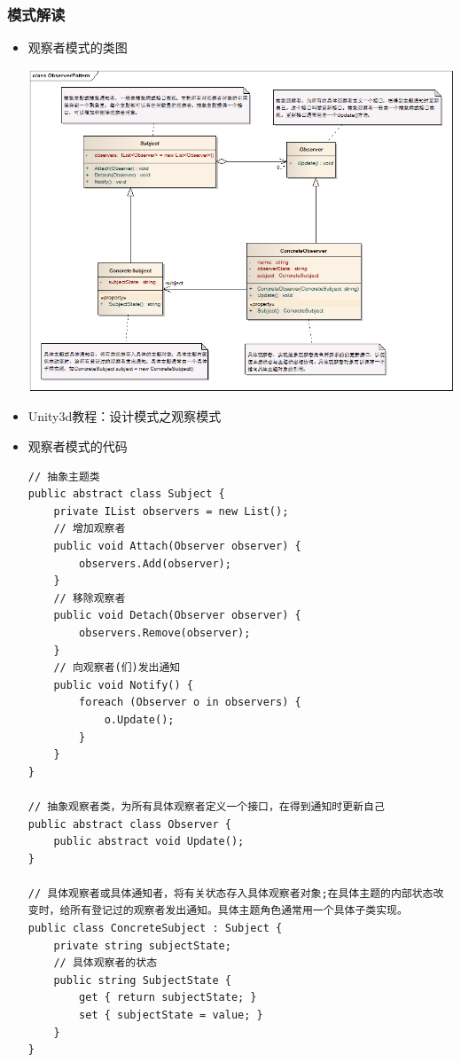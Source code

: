 \documentclass[9pt, b5paper]{article}
\begin{document}
\subsubsection{模式解读}
\label{sec:org22fe456}
\begin{itemize}
\item 观察者模式的类图

\begin{center}
\includegraphics[width=.9\linewidth]{./pic/observer.png}
\end{center}
\item Unity3d教程：设计模式之观察模式
\item 观察者模式的代码
\begin{verbatim}
// 抽象主题类
public abstract class Subject {
    private IList observers = new List();
	// 增加观察者
    public void Attach(Observer observer) {
        observers.Add(observer);
    }
	// 移除观察者
    public void Detach(Observer observer) {
        observers.Remove(observer);
    }
	// 向观察者(们)发出通知
    public void Notify() {
        foreach (Observer o in observers) {
            o.Update();
        }
    }
}

// 抽象观察者类，为所有具体观察者定义一个接口，在得到通知时更新自己
public abstract class Observer {
    public abstract void Update();
}

// 具体观察者或具体通知者，将有关状态存入具体观察者对象;在具体主题的内部状态改变时，给所有登记过的观察者发出通知。具体主题角色通常用一个具体子类实现。
public class ConcreteSubject : Subject {
    private string subjectState;
	// 具体观察者的状态
    public string SubjectState {
        get { return subjectState; }
        set { subjectState = value; }
    }
}


\end{verbatim}
\end{itemize}
\end{document}
